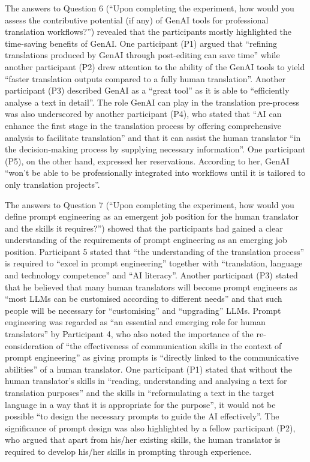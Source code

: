 \documentclass[output=paper,colorlinks,citecolor=brown]{langscibook}
\begin{document}
The answers to Question 6 (“Upon completing the experiment, how would you assess the contributive potential (if any) of GenAI tools for professional translation workflows?”) revealed that the participants mostly highlighted the time-saving benefits of GenAI. One participant (P1) argued that “refining translations produced by GenAI through post-editing can save time” while another participant (P2) drew attention to the ability of the GenAI tools to yield “faster translation outputs compared to a fully human translation”. Another participant (P3) described GenAI as a “great tool” as it is able to “efficiently analyse a text in detail”. The role GenAI can play in the translation pre-process was also underscored by another participant (P4), who stated that “AI can enhance the first stage in the translation process by offering comprehensive analysis to facilitate translation” and that it can assist the human translator “in the decision-making process by supplying necessary information”. One participant (P5), on the other hand, expressed her reservations. According to her, GenAI “won’t be able to be professionally integrated into workflows until it is tailored to only translation projects”.

The answers to Question 7 (“Upon completing the experiment, how would you define prompt engineering as an emergent job position for the human translator and the skills it requires?”) showed that the participants had gained a clear understanding of the requirements of prompt engineering as an emerging job position. Participant 5 stated that “the understanding of the translation process” is required to “excel in prompt engineering” together with “translation, language and technology competence” and “AI literacy”. Another participant (P3) stated that he believed that many human translators will become prompt engineers as “most LLMs can be customised according to different needs” and that such people will be necessary for “customising” and “upgrading” LLMs. Prompt engineering was regarded as “an essential and emerging role for human translators” by Participant 4, who also noted the importance of the re-consideration of “the effectiveness of communication skills in the context of prompt engineering” as giving prompts is “directly linked to the communicative abilities” of a human translator. One participant (P1) stated that without the human translator’s skills in “reading, understanding and analysing a text for translation purposes” and the skills in “reformulating a text in the target language in a way that it is appropriate for the purpose”, it would not be possible “to design the necessary prompts to guide the AI effectively”. The significance of prompt design was also highlighted by a fellow participant (P2), who argued that apart from his/her existing skills, the human translator is required to develop his/her skills in prompting through experience.
\end{document}
